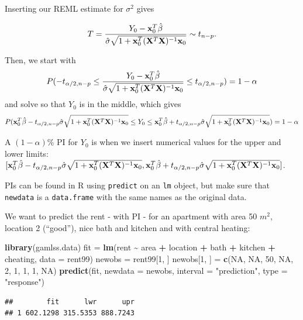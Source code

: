 \documentclass[
  ignorenonframetext,
]{beamer}
\newenvironment{Shaded}{\begin{snugshade}}{\end{snugshade}}
\newcommand{\AttributeTok}[1]{\textcolor[rgb]{0.13,0.29,0.53}{#1}}
\newcommand{\ConstantTok}[1]{\textcolor[rgb]{0.56,0.35,0.01}{#1}}
\newcommand{\DecValTok}[1]{\textcolor[rgb]{0.00,0.00,0.81}{#1}}
\newcommand{\FunctionTok}[1]{\textcolor[rgb]{0.13,0.29,0.53}{\textbf{#1}}}
\newcommand{\NormalTok}[1]{#1}
\newcommand{\OtherTok}[1]{\textcolor[rgb]{0.56,0.35,0.01}{#1}}
\newcommand{\SpecialCharTok}[1]{\textcolor[rgb]{0.81,0.36,0.00}{\textbf{#1}}}
\newcommand{\StringTok}[1]{\textcolor[rgb]{0.31,0.60,0.02}{#1}}
\begin{document}
\begin{frame}
Inserting our REML estimate for \(\sigma^2\) gives

\[T=\frac{Y_0-{\bf x}_0^T \hat{\beta}}{\hat{\sigma}\sqrt{1+{\bf x}_0^T({\bf X}^T{\bf X})^{-1}{\bf x}_0}}\sim t_{n-p}.\]
\end{frame}

\begin{frame}
Then, we start with
\[ P(-t_{\alpha/2,n-p}\le \frac{Y_0-{\bf x}_0^T \hat{\beta}}{\hat{\sigma}\sqrt{1+{\bf x}_0^T({\bf X}^T{\bf X})^{-1}{\bf x}_0}} \le t_{\alpha/2,n-p})=1-\alpha\]
and solve so that \(Y_0\) is in the middle, which gives
\[P({\bf x}_0^T \hat{\beta}-t_{\alpha/2,n-p}\hat{\sigma}\sqrt{1+{\bf x}_0^T({\bf X}^T{\bf X})^{-1}{\bf x}_0} \le Y_0 \le {\bf x}_0^T \hat{\beta}+t_{\alpha/2,n-p}\hat{\sigma}\sqrt{1+{\bf x}_0^T({\bf X}^T{\bf X})^{-1}{\bf x}_0})=1-\alpha\]

A \((1-\alpha)\)\% PI for \(Y_0\) is when we insert numerical values for
the upper and lower limits:
\([{\bf x}_0^T \hat{\beta}-t_{\alpha/2,n-p}\hat{\sigma}\sqrt{1+{\bf x}_0^T({\bf X}^T{\bf X})^{-1}{\bf x}_0}, {\bf x}_0^T \hat{\beta}+t_{\alpha/2,n-p}\hat{\sigma}\sqrt{1+{\bf x}_0^T({\bf X}^T{\bf X})^{-1}{\bf x}_0}]\).
\end{frame}

\begin{frame}[fragile]
PIs can be found in R using \texttt{predict} on an \texttt{lm} object,
but make sure that \texttt{newdata} is a \texttt{data.frame} with the
same names as the original data.

We want to predict the rent - with PI - for an apartment with area 50
\(m^2\), location 2 (``good''), nice bath and kitchen and with central
heating:

\begin{Shaded}
\begin{Highlighting}[]
\FunctionTok{library}\NormalTok{(gamlss.data)}
\NormalTok{fit }\OtherTok{=} \FunctionTok{lm}\NormalTok{(rent }\SpecialCharTok{\textasciitilde{}}\NormalTok{ area }\SpecialCharTok{+}\NormalTok{ location }\SpecialCharTok{+}\NormalTok{ bath }\SpecialCharTok{+}\NormalTok{ kitchen }\SpecialCharTok{+}\NormalTok{ cheating, }\AttributeTok{data =}\NormalTok{ rent99)}
\NormalTok{newobs }\OtherTok{=}\NormalTok{ rent99[}\DecValTok{1}\NormalTok{, ]}
\NormalTok{newobs[}\DecValTok{1}\NormalTok{, ] }\OtherTok{=} \FunctionTok{c}\NormalTok{(}\ConstantTok{NA}\NormalTok{, }\ConstantTok{NA}\NormalTok{, }\DecValTok{50}\NormalTok{, }\ConstantTok{NA}\NormalTok{, }\DecValTok{2}\NormalTok{, }\DecValTok{1}\NormalTok{, }\DecValTok{1}\NormalTok{, }\DecValTok{1}\NormalTok{, }\ConstantTok{NA}\NormalTok{)}
\FunctionTok{predict}\NormalTok{(fit, }\AttributeTok{newdata =}\NormalTok{ newobs, }\AttributeTok{interval =} \StringTok{"prediction"}\NormalTok{, }\AttributeTok{type =} \StringTok{"response"}\NormalTok{)}
\end{Highlighting}
\end{Shaded}

\begin{verbatim}
##        fit      lwr      upr
## 1 602.1298 315.5353 888.7243
\end{verbatim}
\end{frame}
\end{document}
